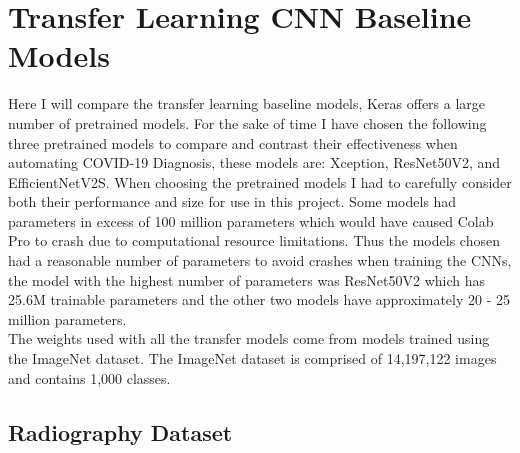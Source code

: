 \section{Transfer Learning CNN Baseline Models}
Here I will compare the transfer learning baseline models, Keras offers a large number of pretrained models\cite{pretrainedModelsKeras}.  For the sake of time I have chosen the following three pretrained models to compare and contrast their effectiveness when automating COVID-19 Diagnosis, these models are: Xception, ResNet50V2, and EfficientNetV2S.  When choosing the pretrained models I had to carefully consider both their performance and size for use in this project.  Some models had parameters in excess of 100 million parameters which would have caused Colab Pro to crash due to computational resource limitations.  Thus the models chosen had a reasonable number of parameters to avoid crashes when training the CNNs, the model with the highest number of parameters was ResNet50V2 which has 25.6M trainable parameters and the other two models have approximately 20 - 25 million parameters.  
\\
The weights used with all the transfer models come from models trained using the ImageNet dataset\cite{imageNet}.  The ImageNet dataset is comprised of 14,197,122 images and contains 1,000 classes.
\subsection{Radiography Dataset}
